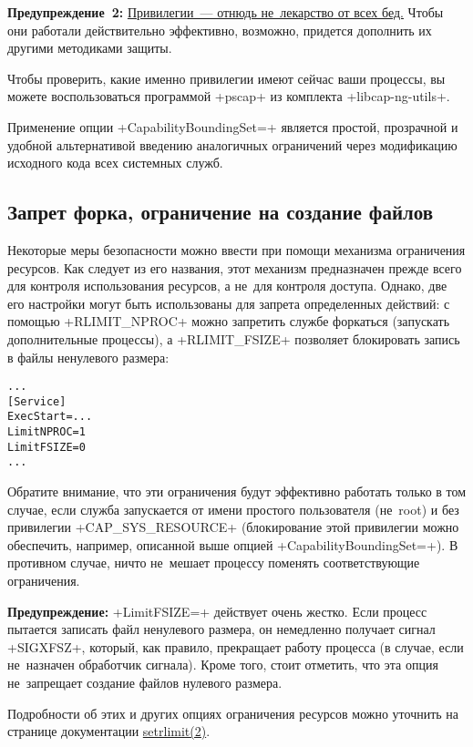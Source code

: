 \documentclass[10pt,oneside,a4paper]{article}
\newenvironment{caveat}[1][]{\smallskip\par\textbf{Предупреждение#1: }}%
	{\smallskip\par}
\begin{document}
\begin{caveat}[~2]
\href{https://forums.grsecurity.net/viewtopic.php?f=7&t=2522}{Привилегии~---
отнюдь не~лекарство от всех бед.} Чтобы они работали действительно эффективно,
возможно, придется дополнить их другими методиками защиты.
\end{caveat}

Чтобы проверить, какие именно привилегии имеют сейчас ваши процессы, вы можете
воспользоваться программой +pscap+ из комплекта +libcap-ng-utils+.

Применение опции +CapabilityBoundingSet=+ является простой, прозрачной и удобной
альтернативой введению аналогичных ограничений через модификацию исходного кода
всех системных служб.

\subsection{Запрет форка, ограничение на создание файлов}

Некоторые меры безопасности можно ввести при помощи механизма ограничения
ресурсов. Как следует из его названия, этот механизм предназначен прежде всего
для контроля использования ресурсов, а не~для контроля доступа. Однако, две его
настройки могут быть использованы для запрета определенных действий:
с помощью +RLIMIT_NPROC+ можно запретить службе форкаться (запускать
дополнительные процессы), а +RLIMIT_FSIZE+ позволяет блокировать запись в файлы
ненулевого размера:
\begin{Verbatim}
...
[Service]
ExecStart=...
LimitNPROC=1
LimitFSIZE=0
...
\end{Verbatim}
Обратите внимание, что эти ограничения будут эффективно работать только в том
случае, если служба запускается от имени простого пользователя (не~root) и
без привилегии +CAP_SYS_RESOURCE+ (блокирование этой привилегии можно
обеспечить, например, описанной выше опцией +CapabilityBoundingSet=+). В
противном случае, ничто не~мешает процессу поменять соответствующие ограничения.

\begin{caveat}
+LimitFSIZE=+ действует очень жестко. Если процесс пытается записать файл
ненулевого размера, он немедленно получает сигнал +SIGXFSZ+, который, как
правило, прекращает работу процесса (в случае, если не~назначен обработчик
сигнала). Кроме того, стоит отметить, что эта опция не~запрещает создание файлов
нулевого размера.
\end{caveat}

Подробности об этих и других опциях ограничения ресурсов можно уточнить на
странице документации \href{http://linux.die.net/man/2/setrlimit}{setrlimit(2)}.
\end{document}
